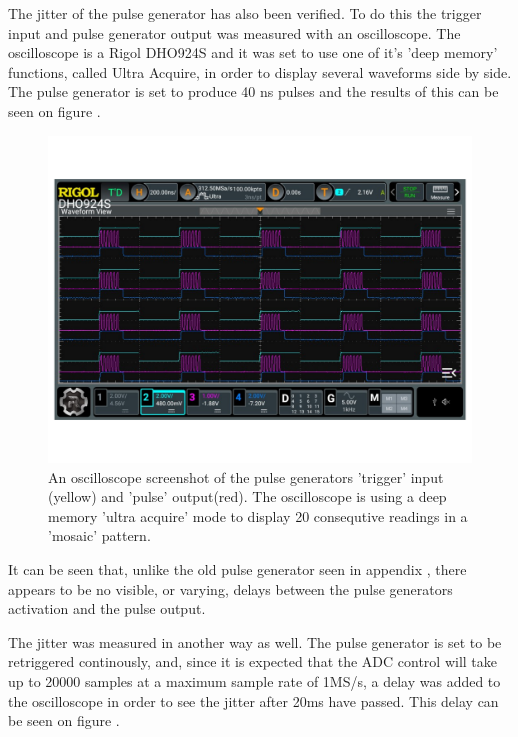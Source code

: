 The jitter of the pulse generator has also been verified. To do this the trigger input and pulse generator output was measured with an oscilloscope. The oscilloscope is a Rigol DHO924S and it was set to use one of it's 'deep memory' functions, called Ultra Acquire, in order to display several waveforms side by side. The pulse generator is set to produce 40 ns pulses and the results of this can be seen on figure .

\begin{figure}[H]
    \centering
    \includegraphics[clip, trim=0 50 0 50, width=1\textwidth]{Appendix/Figures/A_PulseGen_Test.pdf}
    \caption{An oscilloscope screenshot of the pulse generators 'trigger' input (yellow) and 'pulse' output(red). The oscilloscope is using a deep memory 'ultra acquire' mode to display 20 consequtive readings in a 'mosaic' pattern.}
    \label{fig:A_PulseGenWidth_JitterTest}
\end{figure}

It can be seen that, unlike the old pulse generator seen in appendix , there appears to be no visible, or varying, delays between the pulse generators activation and the pulse output.

The jitter was measured in another way as well. The pulse generator is set to be retriggered continously, and, since it is expected that the ADC control will take up to 20000 samples at a maximum sample rate of 1MS/s, a delay was added to the oscilloscope in order to see the jitter after 20ms have passed. This delay can be seen on figure .

